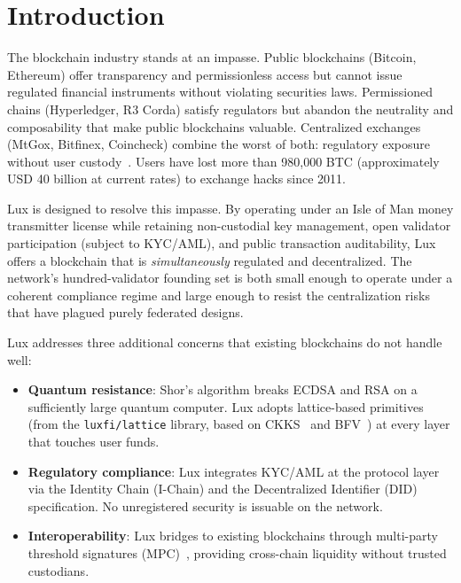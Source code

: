 \section{Introduction}


The blockchain industry stands at an impasse. Public blockchains
(Bitcoin, Ethereum) offer transparency and permissionless access but
cannot issue regulated financial instruments without violating
securities laws. Permissioned chains (Hyperledger, R3 Corda) satisfy
regulators but abandon the neutrality and composability that make
public blockchains valuable. Centralized exchanges (MtGox, Bitfinex,
Coincheck) combine the worst of both: regulatory exposure without
user custody~\cite{hacks}. Users have lost more than 980{,}000 BTC
(approximately USD 40 billion at current rates) to exchange hacks
since 2011.

Lux is designed to resolve this impasse. By operating under an
Isle of Man money transmitter license while retaining non-custodial
key management, open validator participation (subject to KYC/AML),
and public transaction auditability, Lux offers a blockchain that is
\emph{simultaneously} regulated and decentralized. The network's
hundred-validator founding set is both small enough to operate under
a coherent compliance regime and large enough to resist the
centralization risks that have plagued purely federated designs.

Lux addresses three additional concerns that existing blockchains do
not handle well:

\begin{itemize}[nosep]
  \item \textbf{Quantum resistance}: Shor's algorithm breaks ECDSA and
        RSA on a sufficiently large quantum computer. Lux adopts
        lattice-based primitives (from the \texttt{luxfi/lattice}
        library, based on CKKS~\cite{ckks} and BFV~\cite{bfv}) at
        every layer that touches user funds.
  \item \textbf{Regulatory compliance}: Lux integrates KYC/AML at the
        protocol layer via the Identity Chain (I-Chain) and the
        Decentralized Identifier (DID) specification. No unregistered
        security is issuable on the network.
  \item \textbf{Interoperability}: Lux bridges to existing blockchains
        through multi-party threshold signatures
        (MPC)~\cite{threshold-mpc}, providing cross-chain liquidity
        without trusted custodians.
\end{itemize}

